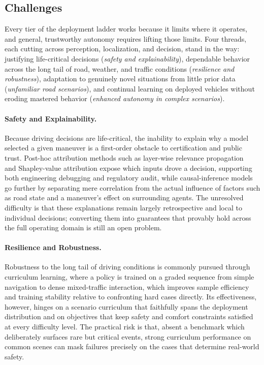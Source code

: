 \subsection{Challenges}
\label{subsec:p4-sec9-2-challenges}
Every tier of the deployment ladder works because it limits where it operates, and general, trustworthy autonomy requires lifting those limits. Four threads, each cutting across perception, localization, and decision, stand in the way: justifying life-critical decisions (\emph{safety and explainability}), dependable behavior across the long tail of road, weather, and traffic conditions (\emph{resilience and robustness}), adaptation to genuinely novel situations from little prior data (\emph{unfamiliar road scenarios}), and continual learning on deployed vehicles without eroding mastered behavior (\emph{enhanced autonomy in complex scenarios}).

\paragraph{Safety and Explainability.}
Because driving decisions are life-critical, the inability to explain why a model selected a given maneuver is a first-order obstacle to certification and public trust.
Post-hoc attribution methods such as layer-wise relevance propagation~\cite{bach2015pixel} and Shapley-value attribution expose which inputs drove a decision, supporting both engineering debugging and regulatory audit, while causal-inference models go further by separating mere correlation from the actual influence of factors such as road state and a maneuver's effect on surrounding agents.
The unresolved difficulty is that these explanations remain largely retrospective and local to individual decisions; converting them into guarantees that provably hold across the full operating domain is still an open problem.

\paragraph{Resilience and Robustness.}
Robustness to the long tail of driving conditions is commonly pursued through curriculum learning, where a policy is trained on a graded sequence from simple navigation to dense mixed-traffic interaction, which improves sample efficiency and training stability relative to confronting hard cases directly.
Its effectiveness, however, hinges on a scenario curriculum that faithfully spans the deployment distribution and on objectives that keep safety and comfort constraints satisfied at every difficulty level.
The practical risk is that, absent a benchmark which deliberately surfaces rare but critical events, strong curriculum performance on common scenes can mask failures precisely on the cases that determine real-world safety.

